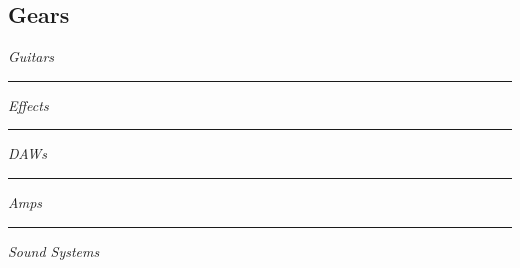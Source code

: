 \documentclass[12pt]{../templates/classes/res}
\begin{document}
\begin{resume}
\begin{minipage}[t]{0.2\linewidth}
  \section{Gears}
  \vspace{10pt}
  \footnotesize{
\begin{minipage}[t]{1.0\linewidth}
  \vspace{1pt}
  \raggedright{\emph{Guitars}}
\end{minipage}
\begin{minipage}[t]{1.0\linewidth}
  \vspace{2pt}
  \vspace{5pt}
\end{minipage}
\rule{1.0\textwidth}{0.1pt}
\begin{minipage}[t]{1.0\linewidth}
  \vspace{1pt}
  \raggedright{\emph{Effects}}
\end{minipage}
\begin{minipage}[t]{1.0\linewidth}
  \vspace{2pt}
  \vspace{5pt}
\end{minipage}
\rule{1.0\textwidth}{0.1pt}
\begin{minipage}[t]{1.0\linewidth}
  \vspace{1pt}
  \raggedright{\emph{DAWs}}
\end{minipage}
\begin{minipage}[t]{1.0\linewidth}
  \vspace{2pt}
  \vspace{5pt}
\end{minipage}
\rule{1.0\textwidth}{0.1pt}
\begin{minipage}[t]{1.0\linewidth}
  \vspace{1pt}
  \raggedright{\emph{Amps}}
\end{minipage}
\begin{minipage}[t]{1.0\linewidth}
  \vspace{2pt}
  \vspace{5pt}
\end{minipage}
\rule{1.0\textwidth}{0.1pt}
\begin{minipage}[t]{1.0\linewidth}
  \vspace{1pt}
  \raggedright{\emph{Sound Systems}}
\end{minipage}
\begin{minipage}[t]{1.0\linewidth}
  \vspace{2pt}
  \vspace{5pt}
\end{minipage}
}
\end{minipage}
\hfill
\begin{minipage}[t]{0.35\linewidth}

\end{minipage}
\end{resume}
\end{document}
